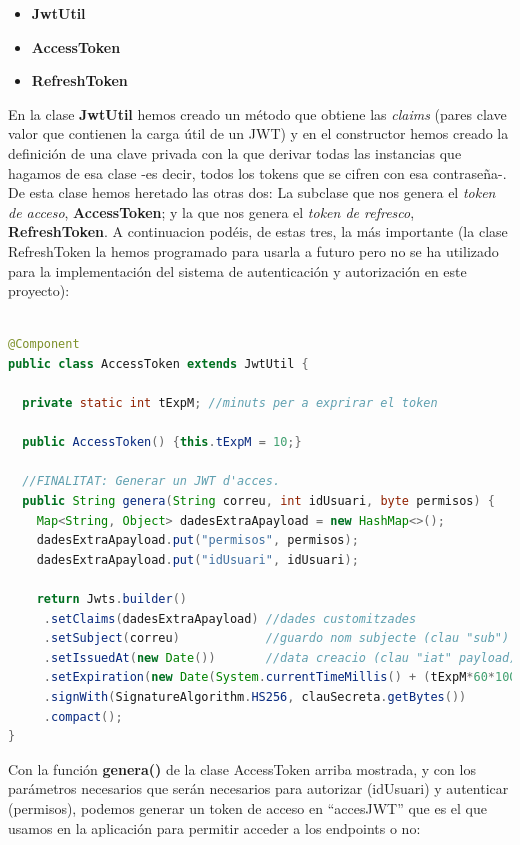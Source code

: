 \documentclass[a4paper,12pt]{report}
\begin{document}
		\begin{itemize}
			\setlength{\itemsep}{-.4em}
			\item \textbf{JwtUtil}
			\item \textbf{AccessToken}
			\item \textbf{RefreshToken}
		\end{itemize}
		  
		
		En la clase \textbf{JwtUtil} hemos creado un método que obtiene las \textit{claims} (pares clave valor que contienen la carga útil de un JWT) y en el constructor hemos creado la definición de una clave privada con la que derivar todas las instancias que hagamos de esa clase -es decir, todos los tokens que se cifren con esa contraseña-. De esta clase hemos heretado las otras dos: La subclase que nos genera el \textit{token de acceso}, \textbf{AccessToken}; y la que nos genera el \textit{token de refresco}, \textbf{RefreshToken}. A continuacion podéis, de estas tres, la más importante (la clase RefreshToken la hemos programado para usarla a futuro pero no se ha utilizado para la implementación del sistema de autenticación y autorización en este proyecto): 
		
		

		
\begin{lstlisting}[language=Java, basicstyle=\ttfamily\footnotesize, keywordstyle=\color{magenta}]
				
@Component
public class AccessToken extends JwtUtil {
	
  private static int tExpM; //minuts per a exprirar el token
	
  public AccessToken() {this.tExpM = 10;}
	
  //FINALITAT: Generar un JWT d'acces.
  public String genera(String correu, int idUsuari, byte permisos) {
	Map<String, Object> dadesExtraApayload = new HashMap<>();
	dadesExtraApayload.put("permisos", permisos);
	dadesExtraApayload.put("idUsuari", idUsuari);
		
	return Jwts.builder()
	 .setClaims(dadesExtraApayload) //dades customitzades
	 .setSubject(correu)            //guardo nom subjecte (clau "sub")
	 .setIssuedAt(new Date())       //data creacio (clau "iat" payload)
	 .setExpiration(new Date(System.currentTimeMillis() + (tExpM*60*1000)))
	 .signWith(SignatureAlgorithm.HS256, clauSecreta.getBytes())
	 .compact();
}


\end{lstlisting}
		
		
		
		Con la función \textbf{genera()} de la clase AccessToken arriba mostrada, y con los parámetros necesarios que serán necesarios para autorizar (idUsuari) y autenticar (permisos), podemos generar un token de acceso en ``accesJWT'' que es el que usamos en la aplicación para permitir acceder a los endpoints o no:
		
\end{document}
